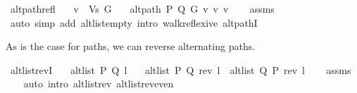 \begin{isabellebody}
\isanewline
%
\endisadelimproof
%
\isadeliminvisible
\isanewline
%
\endisadeliminvisible
%
\isataginvisible
{}\isamarkupfalse%
\ alt{\isacharunderscore}{\kern0pt}path{\isacharunderscore}{\kern0pt}refl{\isacharcolon}{\kern0pt}\isanewline
\ \ \ {\isachardoublequoteopen}v\ {\isasymin}\ Vs\ G{\isachardoublequoteclose}\isanewline
\ \ \ {\isachardoublequoteopen}alt{\isacharunderscore}{\kern0pt}path\ P\ Q\ G\ {\isacharbrackleft}{\kern0pt}v{\isacharbrackright}{\kern0pt}\ v\ v{\isachardoublequoteclose}%
\endisataginvisible
{\isafoldinvisible}%
%
\isadeliminvisible
\isanewline
%
\endisadeliminvisible
%
\isadelimproof
\ \ %
\endisadelimproof
%
\isatagproof
{}\isamarkupfalse%
\ assms\isanewline
\ \ \isamarkupfalse%
\ {\isacharparenleft}{\kern0pt}auto\ simp\ add{\isacharcolon}{\kern0pt}\ alt{\isacharunderscore}{\kern0pt}list{\isacharunderscore}{\kern0pt}empty\ intro{\isacharcolon}{\kern0pt}\ walk{\isacharunderscore}{\kern0pt}reflexive\ alt{\isacharunderscore}{\kern0pt}pathI{\isacharparenright}{\kern0pt}%
\endisatagproof
{\isafoldproof}%
%
\isadelimproof
%
\endisadelimproof
%
\begin{isamarkuptext}%
As is the case for paths, we can reverse alternating paths.%
\end{isamarkuptext}\isamarkuptrue%
%
\isadeliminvisible
%
\endisadeliminvisible
%
\isataginvisible
{}\isamarkupfalse%
\ alt{\isacharunderscore}{\kern0pt}list{\isacharunderscore}{\kern0pt}revI{\isacharcolon}{\kern0pt}\isanewline
\ \ \ {\isachardoublequoteopen}alt{\isacharunderscore}{\kern0pt}list\ P\ Q\ l{\isachardoublequoteclose}\isanewline
\ \ \ {\isachardoublequoteopen}alt{\isacharunderscore}{\kern0pt}list\ P\ Q\ {\isacharparenleft}{\kern0pt}rev\ l{\isacharparenright}{\kern0pt}\ {\isasymor}\ alt{\isacharunderscore}{\kern0pt}list\ Q\ P\ {\isacharparenleft}{\kern0pt}rev\ l{\isacharparenright}{\kern0pt}{\isachardoublequoteclose}%
\endisataginvisible
{\isafoldinvisible}%
%
\isadeliminvisible
%
\endisadeliminvisible
\isanewline
%
\isadelimproof
\ \ %
\endisadelimproof
%
\isatagproof
{}\isamarkupfalse%
\ assms\isanewline
\ \ \isamarkupfalse%
\ {\isacharparenleft}{\kern0pt}auto\ intro{\isacharcolon}{\kern0pt}\ alt{\isacharunderscore}{\kern0pt}list{\isacharunderscore}{\kern0pt}rev\ alt{\isacharunderscore}{\kern0pt}list{\isacharunderscore}{\kern0pt}rev{\isacharunderscore}{\kern0pt}even{\isacharparenright}{\kern0pt}%
\endisatagproof
{\isafoldproof}%
%
\isadelimproof
%
\endisadelimproof

\end{isabellebody}

